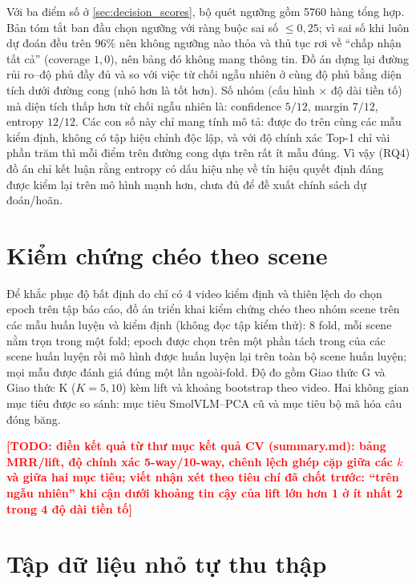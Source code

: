 \documentclass[12pt,a4paper]{report}
\newcommand{\TODO}[1]{\textcolor{red}{\textbf{[TODO: #1]}}}
\begin{document}
Với ba điểm số ở \cref{sec:decision_scores}, bộ quét ngưỡng gồm 5760 hàng tổng hợp. Bản tóm tắt ban đầu chọn ngưỡng với ràng buộc sai số $\le 0{,}25$; vì sai số khi luôn dự đoán đều trên $96\%$ nên không ngưỡng nào thỏa và thủ tục rơi về ``chấp nhận tất cả'' (coverage $1{,}0$), nên bảng đó không mang thông tin. Đồ án dựng lại đường rủi ro--độ phủ đầy đủ và so với việc từ chối ngẫu nhiên ở cùng độ phủ bằng diện tích dưới đường cong (nhỏ hơn là tốt hơn). Số nhóm (cấu hình $\times$ độ dài tiền tố) mà diện tích thấp hơn từ chối ngẫu nhiên là: confidence $5/12$, margin $7/12$, entropy $12/12$. Các con số này chỉ mang tính mô tả: được đo trên cùng các mẫu kiểm định, không có tập hiệu chỉnh độc lập, và với độ chính xác Top-1 chỉ vài phần trăm thì mỗi điểm trên đường cong dựa trên rất ít mẫu đúng. Vì vậy (RQ4) đồ án chỉ kết luận rằng entropy có dấu hiệu nhẹ về tín hiệu quyết định đáng được kiểm lại trên mô hình mạnh hơn, chưa đủ để đề xuất chính sách dự đoán/hoãn.

\section{Kiểm chứng chéo theo scene}
\label{sec:scene_cv}

Để khắc phục độ bất định do chỉ có 4 video kiểm định và thiên lệch do chọn epoch trên tập báo cáo, đồ án triển khai kiểm chứng chéo theo nhóm scene trên các mẫu huấn luyện và kiểm định (không đọc tập kiểm thử): 8 fold, mỗi scene nằm trọn trong một fold; epoch được chọn trên một phần tách trong của các scene huấn luyện rồi mô hình được huấn luyện lại trên toàn bộ scene huấn luyện; mọi mẫu được đánh giá đúng một lần ngoài-fold. Độ đo gồm Giao thức G và Giao thức K ($K=5,10$) kèm lift và khoảng bootstrap theo video. Hai không gian mục tiêu được so sánh: mục tiêu SmolVLM--PCA cũ và mục tiêu bộ mã hóa câu đóng băng.

\TODO{điền kết quả từ thư mục kết quả CV (summary.md): bảng MRR/lift, độ chính xác 5-way/10-way, chênh lệch ghép cặp giữa các $k$ và giữa hai mục tiêu; viết nhận xét theo tiêu chí đã chốt trước: ``trên ngẫu nhiên'' khi cận dưới khoảng tin cậy của lift lớn hơn 1 ở ít nhất 2 trong 4 độ dài tiền tố}

\section{Tập dữ liệu nhỏ tự thu thập}
\label{sec:own_dataset}
\end{document}
